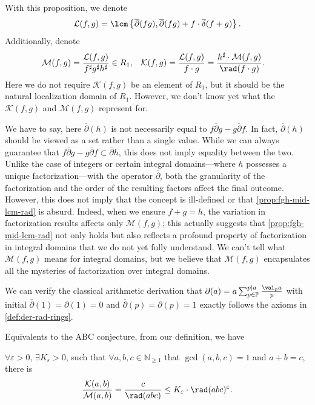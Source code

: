With this proposition, we denote
\[ \mathcal{L}(f, g) = \lcm\left\{\overline{\partial}(fg), \overline{\partial}(fg) + f\cdot\overline{\delta}(f + g)\right\}. \]
Additionally, denote
\begin{align*}
	\mathcal{M}(f, g) &= \frac{\mathcal{L}(f,g)}{f^{\sharp}g^{\sharp}h^{\sharp}} \in R_1, &\mathcal{K}(f, g) &= \frac{\mathcal{L}(f,g)}{f\cdot g} = \frac{h^{\sharp}\cdot\mathcal{M}(f,g)}{\rad(f\cdot g)}.
\end{align*}
Here we do not require $\mathcal{K}(f, g)$ be an element of $R_1$, but it should be the natural localization domain of $R_1$. However, we don't know yet what the $\mathcal{K}(f, g)$ and $\mathcal{M}(f, g)$ represent for.

We have to say, here $\overline{\partial}(h)$ is not necessarily equal to $f\overline{\partial}g - g\overline{\partial}f$. In fact, $\overline{\partial}(h)$ should be viewed as a set rather than a single value. While we can always guarantee that $f\overline{\partial}g - g\overline{\partial}f \subset \overline{\partial} h$, this does not imply equality between the two. Unlike the case of integers or certain integral domains—where $h$ possesses a unique factorization—with the operator $\overline{\partial}$, both the granularity of the factorization and the order of the resulting factors affect the final outcome. However, this does not imply that the concept is ill-defined or that \cref{prop:fgh-mid-lcm-rad} is absurd. Indeed, when we ensure $f + g = h$, the variation in factorization results affects only $\mathcal{M}(f, g)$; this actually suggests that \cref{prop:fgh-mid-lcm-rad} not only holds but also reflects a profound property of factorization in integral domains that we do not yet fully understand. We can't tell what $\mathcal{M}(f, g)$ means for integral domains, but we believe that $\mathcal{M}(f, g)$ encapsulates all the mysteries of factorization over integral domains.

We can verify the classical arithmetic derivation that $\partial(a) = a\sum_{p\in\mathbb{P}}^{p\mid a}\frac{\val_{p} a}{p}$ with initial $\overline{\partial}(1) = \partial(1) = 0$ and $\overline{\partial}(p) = \partial(p) = 1$ exactly follows the axioms in \cref{def:der-rad-rings}.

Equivalents to the ABC conjecture, from our definition, we have
\begin{conjecture}
	$\forall \varepsilon > 0$, $\exists K_{\varepsilon} > 0$, such that $\forall a, b, c\in\mathbb{N}_{\ge 1}$ that $\gcd(a, b, c) = 1$ and $a + b = c$, there is
	\[ \frac{\mathcal{K}(a, b)}{\mathcal{M}(a, b)} = \frac{c}{\rad(abc)} \le K_{\varepsilon}\cdot \rad(abc)^{\varepsilon}. \]
\end{conjecture}
